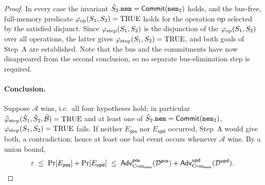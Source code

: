\begin{proof}
In every case the invariant $\hat{S}_2.\mathtt{mem}=\mathsf{Commit}(\mathtt{mem}_2)$ holds, and
the bus-free, full-memory predicate
$\varphi_{\mathrm{op}}(S_1,S_2)=\mathrm{TRUE}$ holds for the operation $\mathrm{op}$ selected by
the satisfied disjunct.  Since $\varphi_{\mathrm{step}}(S_1,S_2)$ is the disjunction of
the $\varphi_{\mathrm{op}}(S_1,S_2)$ over all operations, the latter gives
$\varphi_{\mathrm{step}}(S_1,S_2)=\mathrm{TRUE}$, and both goals of Step~A are
established.  Note that the bus and the commitments have now disappeared from
the second conclusion, so no separate bus-elimination step is required.

\paragraph{Conclusion.}
Suppose $\mathcal{A}$ wins, i.e.\ all four hypotheses hold; in particular
$\widehat{\varphi}_{\mathrm{step}}(\hat{S}_1,\hat{S}_2,\widehat{\mathcal{B}})=\mathrm{TRUE}$ and
at least one of $\hat{S}_2.\mathtt{mem}=\mathsf{Commit}(\mathtt{mem}_2)$,
$\varphi_{\mathrm{step}}(S_1,S_2)=\mathrm{TRUE}$ fails. If neither $E_{\mathsf{pos}}$ nor
$E_{\mathsf{upd}}$ occurred, Step~A would give both, a contradiction; hence at
least one bad event occurs whenever $\mathcal{A}$ wins. By a union bound,
\[
  \varepsilon \;\le\; \Pr[E_{\mathsf{pos}}] + \Pr[E_{\mathsf{upd}}]
  \;\le\;
  \mathsf{Adv}^{\mathsf{pos}}_{\mathrm{Com}_{\mathsf{mem}}}(\mathcal{D}^{\mathsf{pos}})
  + \mathsf{Adv}^{\mathsf{upd}}_{\mathrm{Com}_{\mathsf{mem}}}(\mathcal{D}^{\mathsf{upd}}).
\]
\end{proof}

